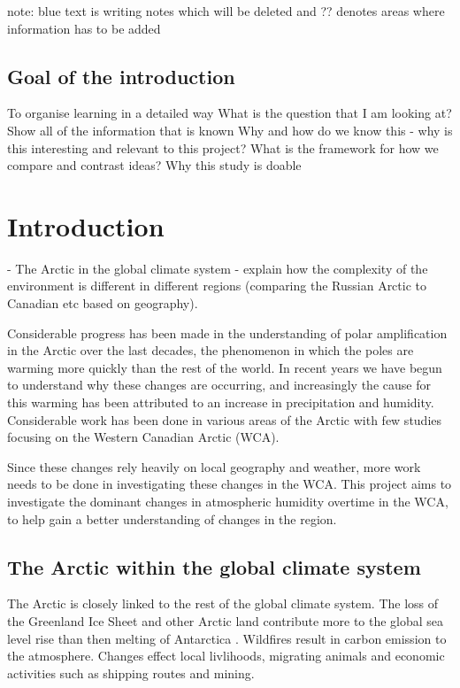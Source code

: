 \documentclass[12pt, oneside]{article}
\begin{document}
{\color{blue}note: blue text is writing notes which will be deleted and ?? denotes areas where information has to be added 

\subsection{Goal of the introduction}
To organise learning in a detailed way 
What is the question that I am looking at?
Show all of the information that is known 
Why and how do we know this - why is this interesting and relevant to this project?
What is the framework for how we compare and contrast ideas?
Why this study is doable}
\section{Introduction}
{\color{blue}
- The Arctic in the global climate system
- explain how the complexity of the environment is different in different regions (comparing the Russian Arctic to Canadian etc based on geography).
}

Considerable progress has been made in the understanding of polar amplification in the Arctic over the last decades, the phenomenon in which the poles are warming more quickly than the rest of the world. In recent
years we have begun to understand why these changes are
occurring, and increasingly the cause for this warming has been attributed to an increase in
precipitation and humidity. Considerable work has been done in various areas of the Arctic with few studies focusing on the Western Canadian Arctic (WCA). 

Since these changes rely heavily on local geography and weather, more work needs to be done in investigating these changes in the WCA. This project aims to investigate the dominant changes in atmospheric humidity overtime in the WCA, to help gain a better understanding of changes in the region. 

\subsection{The Arctic within the global climate system}
The Arctic is closely linked to the rest of the global climate system. The loss of the Greenland Ice Sheet and other Arctic land contribute more to the global sea level rise than then melting of Antarctica \cite{amap}. Wildfires result in carbon emission to the atmosphere. Changes effect local livlihoods, migrating animals and economic activities such as shipping routes and mining. 
\end{document}
